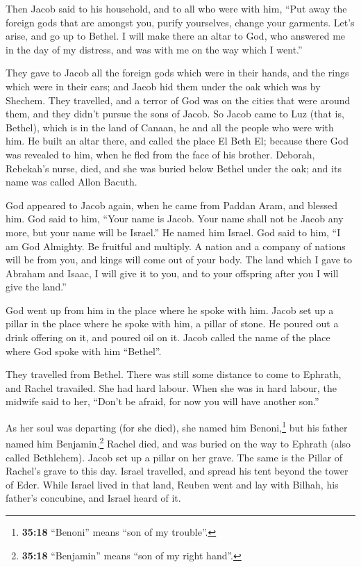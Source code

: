  Then Jacob said to his household, and to all who were
with him, ``Put away the foreign gods that are amongst you, purify
yourselves, change your garments.  Let's arise, and go up
to Bethel. I will make there an altar to God, who answered me in the day
of my distress, and was with me on the way which I went.''

 They gave to Jacob all the foreign gods which were in
their hands, and the rings which were in their ears; and Jacob hid them
under the oak which was by Shechem.  They travelled, and a
terror of God was on the cities that were around them, and they didn't
pursue the sons of Jacob.  So Jacob came to Luz (that is,
Bethel), which is in the land of Canaan, he and all the people who were
with him.  He built an altar there, and called the place
El Beth El; because there God was revealed to him, when he fled from the
face of his brother.  Deborah, Rebekah's nurse, died, and
she was buried below Bethel under the oak; and its name was called Allon
Bacuth.

 God appeared to Jacob again, when he came from Paddan
Aram, and blessed him.  God said to him, ``Your name is
Jacob. Your name shall not be Jacob any more, but your name will be
Israel.'' He named him Israel.  God said to him, ``I am
God Almighty. Be fruitful and multiply. A nation and a company of
nations will be from you, and kings will come out of your body.
 The land which I gave to Abraham and Isaac, I will give
it to you, and to your offspring after you I will give the land.''

 God went up from him in the place where he spoke with
him.  Jacob set up a pillar in the place where he spoke
with him, a pillar of stone. He poured out a drink offering on it, and
poured oil on it.  Jacob called the name of the place
where God spoke with him ``Bethel''.

 They travelled from Bethel. There was still some
distance to come to Ephrath, and Rachel travailed. She had hard labour.
 When she was in hard labour, the midwife said to her,
``Don't be afraid, for now you will have another son.''

 As her soul was departing (for she died), she named him
Benoni,\footnote{\textbf{35:18} ``Benoni'' means ``son of my trouble''.}
but his father named him Benjamin.\footnote{\textbf{35:18} ``Benjamin''
  means ``son of my right hand''.}  Rachel died, and was
buried on the way to Ephrath (also called Bethlehem). 
Jacob set up a pillar on her grave. The same is the Pillar of Rachel's
grave to this day.  Israel travelled, and spread his tent
beyond the tower of Eder.  While Israel lived in that
land, Reuben went and lay with Bilhah, his father's concubine, and
Israel heard of it.

